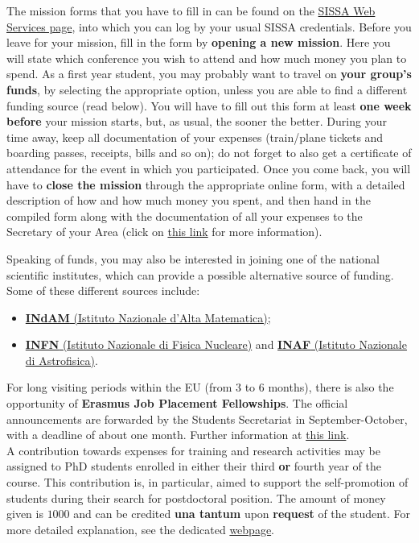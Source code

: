 \documentclass{sissavademecum}
\begin{document}
The mission forms that you have to fill in can be found on the \href{https://services.sissa.it/online/}{SISSA Web Services page}, into which you can log by your usual SISSA credentials. Before you leave for your mission, fill in the form by \textbf{opening a new mission}. Here you will state which conference you wish to attend and how much money you plan to spend. As a first year student, you may probably want to travel on \textbf{your group's funds}, by selecting the appropriate option, unless you are able to find a different funding source (read below). You will have to fill out this form at least \textbf{one week before} your mission starts, but, as usual, the sooner the better. During your time away, keep all documentation of your expenses (train/plane tickets and boarding passes, receipts, bills and so on); do not forget to also get a certificate of attendance for the event in which you participated. Once you come back, you will have to \textbf{close the mission} through the appropriate online form, with a detailed description of how and how much money you spent, and then hand in the compiled form along with the documentation of all your expenses to the Secretary of your Area (click on \href{http://wiki.sissa.it/students/index.php/SISSA_staff}{this link} for more information).

Speaking of funds, you may also be interested in joining one of the national scientific institutes, which can provide a possible alternative source of funding. Some of these different sources include:

\begin{itemize}
    \item \href{http://www.altamatematica.it}{ \textbf{INdAM} (Istituto Nazionale d'Alta Matematica)};
    \item \href{http://home.infn.it/en/}{\textbf{INFN} (Istituto Nazionale di Fisica Nucleare)} and \href{http://www.inaf.it/en?set_language=en}{\textbf{INAF} (Istituto Nazionale di Astrofisica)}.
\end{itemize}

For long visiting periods within the EU (from 3 to 6 months), there is also the opportunity of \textbf{Erasmus Job Placement Fellowships}. The official announcements are forwarded by the Students Secretariat in September-October, with a deadline of about one month. Further information at \href{http://wiki.sissa.it/students/index.php/Erasmus_\%2B_Programme}{this link}. \\

A contribution towards expenses for training and research activities may be assigned to PhD students enrolled in either their third \textbf{or} fourth year of the course. This contribution is, in particular, aimed to support the self-promotion of students during their search for postdoctoral position. The amount of money given is \EUR{} $1000$ and can be credited \textbf{una tantum} upon \textbf{request} of the student. For more detailed explanation, see the dedicated \href{https://wiki.sissa.it/students/index.php/Training_and_research_contribution}{webpage}.
\end{document}
